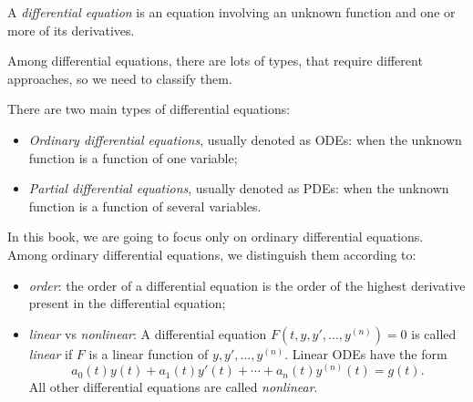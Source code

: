 %
\hfill

\begin{definition}
	A \emph{differential equation} is an equation involving an unknown function and one or more of its derivatives.
\end{definition}


Among differential equations, there are lots of types, that require different approaches, so we need to classify them.

\begin{definition}
	There are two main types of differential equations:
	\begin{itemize}
		\item \emph{Ordinary differential equations}, usually denoted as ODEs: when the unknown function is a function of one variable;
		\item \emph{Partial differential equations}, usually denoted as PDEs: when the unknown function is a function of several variables. \\
	\end{itemize}	
	
	In this book, we are going to focus only on ordinary differential equations. \\
		
	Among ordinary differential equations, we distinguish them according to:
	
	\begin{itemize}
		\item \emph{order}: the order of a differential equation is the order of the highest derivative present in the differential equation;
		\item \emph{linear} vs \emph{nonlinear}: A differential equation \quad $F\left(t,y,y',\ldots,y^{(n)}\right) = 0$ \quad is called \emph{linear} if $F$ is a linear function of $y, y', \ldots, y^{(n)}$. Linear ODEs have the form
			$$ a_0(t) y(t) + a_1(t) y'(t) + \cdots + a_n(t) y^{(n)}(t) = g(t). $$
			All other differential equations are called \emph{nonlinear}.
	\end{itemize}
\end{definition}

